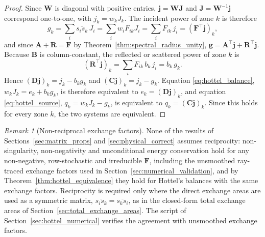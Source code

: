 \documentclass[preprint,1p,times]{elsarticle}
\theoremstyle{plain}
\theoremstyle{definition}
\theoremstyle{remark}
\newtheorem{remark}[theorem]{Remark}
\begin{document}
\begin{proof}
Since $\mathbf{W}$ is diagonal with positive entries, $\mathbf{j} = \mathbf{W}\mathbf{J}$ and $\mathbf{J} = \mathbf{W}^{-1}\mathbf{j}$ correspond one-to-one, with $j_k = w_k J_k$. The incident power of zone $k$ is therefore
\begin{equation*}
g_k = \sum_i \overline{s_i s_k}\, J_i = \sum_i w_i F_{ik} J_i = \sum_i F_{ik}\, j_i = (\mathbf{F}^\top \mathbf{j})_k ,
\end{equation*}
and since $\mathbf{A} + \mathbf{R} = \mathbf{F}$ by Theorem~\ref{thm:spectral_radius_unity}, $\mathbf{g} = \mathbf{A}^\top\mathbf{j} + \mathbf{R}^\top\mathbf{j}$. Because $\mathbf{B}$ is column-constant, the reflected or scattered power of zone $k$ is
\begin{equation*}
(\mathbf{R}^\top \mathbf{j})_k = \sum_i F_{ik}\, b_k\, j_i = b_k\, g_k .
\end{equation*}
Hence $(\mathbf{D}\mathbf{j})_k = j_k - b_k g_k$ and $(\mathbf{C}\mathbf{j})_k = j_k - g_k$. Equation \eqref{eq:hottel_balance}, $w_k J_k = e_k + b_k g_k$, is therefore equivalent to $e_k = (\mathbf{D}\mathbf{j})_k$, and equation \eqref{eq:hottel_source}, $q_k = w_k J_k - g_k$, is equivalent to $q_k = (\mathbf{C}\mathbf{j})_k$. Since this holds for every zone $k$, the two systems are equivalent.
\end{proof}

\begin{remark}[Non-reciprocal exchange factors]
\label{rem:nonreciprocal}
None of the results of Sections~\ref{sec:matrix_props} and \ref{sec:physical_correct} assumes reciprocity: non-singularity, non-negativity and unconditional energy conservation hold for any non-negative, row-stochastic and irreducible $\mathbf{F}$, including the unsmoothed ray-traced exchange factors used in Section~\ref{sec:numerical_validation}, and by Theorem~\ref{thm:hottel_equivalence} they hold for Hottel's balances with the same exchange factors. Reciprocity is required only where the direct exchange areas are used as a symmetric matrix, $\overline{s_i s_k} = \overline{s_k s_i}$, as in the closed-form total exchange areas of Section~\ref{sec:total_exchange_areas}. The script of Section~\ref{sec:hottel_numerical} verifies the agreement with unsmoothed exchange factors.
\end{remark}
\end{document}
